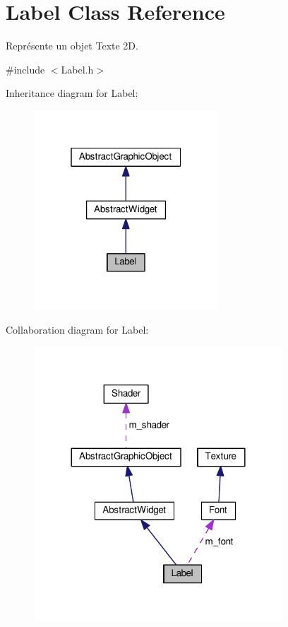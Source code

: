 \hypertarget{classLabel}{\section{Label Class Reference}
\label{classLabel}
}


Représente un objet Texte 2\+D.  




{\ttfamily \#include $<$Label.\+h$>$}



Inheritance diagram for Label\+:\nopagebreak
\begin{figure}[H]
\begin{center}
\leavevmode
\includegraphics[width=196pt]{classLabel__inherit__graph}
\end{center}
\end{figure}


Collaboration diagram for Label\+:\nopagebreak
\begin{figure}[H]
\begin{center}
\leavevmode
\includegraphics[width=264pt]{classLabel__coll__graph}
\end{center}
\end{figure}

